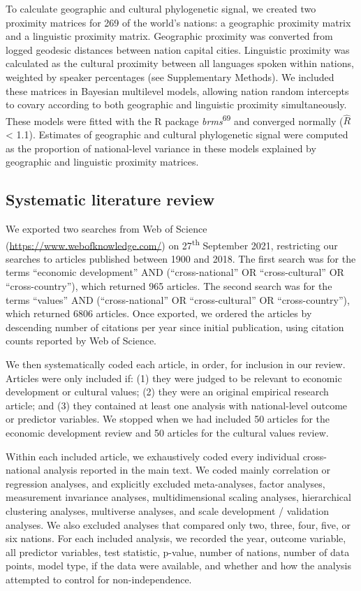 \documentclass[english,man,floatsintext]{apa6}
\begin{document}
To calculate geographic and cultural phylogenetic signal, we created two proximity matrices for 269 of the world's nations: a geographic proximity matrix and a linguistic proximity matrix. Geographic proximity was converted from logged geodesic distances between nation capital cities. Linguistic proximity was calculated as the cultural proximity between all languages spoken within nations, weighted by speaker percentages (see Supplementary Methods). We included these matrices in Bayesian multilevel models, allowing nation random intercepts to covary according to both geographic and linguistic proximity simultaneously. These models were fitted with the R package \emph{brms}\textsuperscript{69} and converged normally (\(\hat{R}\) \textless{} 1.1). Estimates of geographic and cultural phylogenetic signal were computed as the proportion of national-level variance in these models explained by geographic and linguistic proximity matrices.

\hypertarget{systematic-literature-review}{%
\subsection{Systematic literature review}\label{systematic-literature-review}}

We exported two searches from Web of Science (\url{https://www.webofknowledge.com/}) on 27\textsuperscript{th} September 2021, restricting our searches to articles published between 1900 and 2018. The first search was for the terms \enquote{economic development} AND (\enquote{cross-national} OR \enquote{cross-cultural} OR \enquote{cross-country}), which returned 965 articles. The second search was for the terms \enquote{values} AND (\enquote{cross-national} OR \enquote{cross-cultural} OR \enquote{cross-country}), which returned 6806 articles. Once exported, we ordered the articles by descending number of citations per year since initial publication, using citation counts reported by Web of Science.

We then systematically coded each article, in order, for inclusion in our review. Articles were only included if: (1) they were judged to be relevant to economic development or cultural values; (2) they were an original empirical research article; and (3) they contained at least one analysis with national-level outcome or predictor variables. We stopped when we had included 50 articles for the economic development review and 50 articles for the cultural values review.

Within each included article, we exhaustively coded every individual cross-national analysis reported in the main text. We coded mainly correlation or regression analyses, and explicitly excluded meta-analyses, factor analyses, measurement invariance analyses, multidimensional scaling analyses, hierarchical clustering analyses, multiverse analyses, and scale development / validation analyses. We also excluded analyses that compared only two, three, four, five, or six nations. For each included analysis, we recorded the year, outcome variable, all predictor variables, test statistic, p-value, number of nations, number of data points, model type, if the data were available, and whether and how the analysis attempted to control for non-independence.
\end{document}
